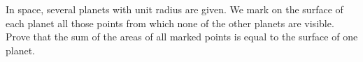 In space, several planets with unit radius are given. We mark on the surface of each planet all those points from which none of the other planets are visible. Prove that the sum of the areas of all marked points is equal to the surface of one planet.
